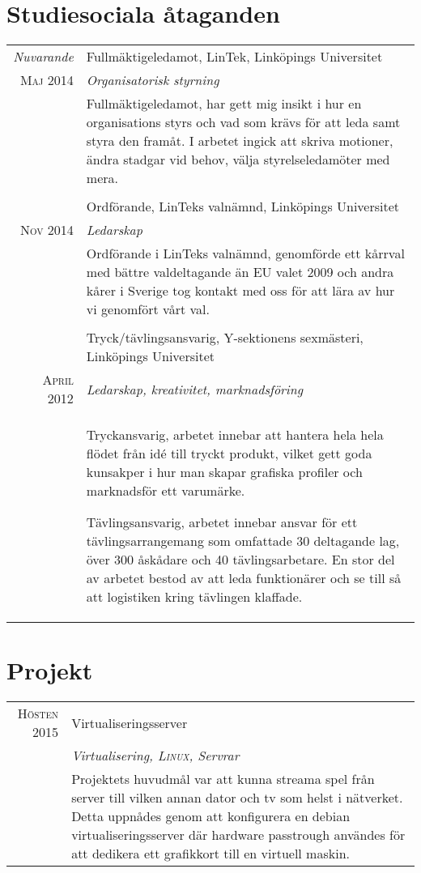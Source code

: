 \documentclass[a4paper,10pt]{article}
\begin{document}
\section{Studiesociala åtaganden}
\begin{tabular}{r|p{11cm}}

    \emph{Nuvarande} &  Fullmäktigeledamot, LinTek, Linköpings Universitet\\
    \textsc{Maj 2014} & \emph{Organisatorisk styrning}\\
    &\footnotesize{Fullmäktigeledamot, har gett mig insikt i hur en organisations styrs och vad som krävs för att leda samt styra den framåt. I arbetet ingick att skriva motioner, ändra stadgar vid behov, välja styrelseledamöter med mera.}\\\multicolumn{2}{c}{} \\
    
    &  Ordförande,  LinTeks valnämnd, Linköpings Universitet\\
    \textsc{Nov 2014} & \emph{Ledarskap}\\
    &\footnotesize{Ordförande i LinTeks valnämnd, genomförde ett kårrval med bättre valdeltagande än EU valet 2009 och andra kårer i Sverige tog kontakt med oss för att lära av hur vi genomfört vårt val. }\\\multicolumn{2}{c}{} \\
    
    &  Tryck/tävlingsansvarig, Y-sektionens sexmästeri, Linköpings Universitet\\
    \textsc{April 2012} & \emph{Ledarskap, kreativitet, marknadsföring}\\
    &\footnotesize{Tryckansvarig, arbetet innebar att hantera hela hela flödet från idé till tryckt produkt, vilket gett goda kunsakper i hur man skapar grafiska profiler och marknadsför ett varumärke. 
    
    
    Tävlingsansvarig, arbetet innebar ansvar för ett tävlingsarrangemang som omfattade 30 deltagande lag, över 300 åskådare och 40 tävlingsarbetare. En stor del av arbetet bestod av att leda funktionärer och se till så att logistiken kring tävlingen klaffade. 
    }\\
    
    
\end{tabular}

\section{Projekt}
\begin{tabular}{r|p{11cm}}
    \textsc{Hösten 2015} & Virtualiseringsserver\\
    & \emph{Virtualisering, \textsc{Linux}, Servrar}\\
    &\footnotesize{Projektets huvudmål var att kunna streama spel från server till vilken annan dator och tv som helst i nätverket. Detta uppnådes genom att konfigurera en debian virtualiseringsserver där hardware passtrough användes för att dedikera ett grafikkort till en virtuell maskin.}\\
\end{tabular}
\end{document}
